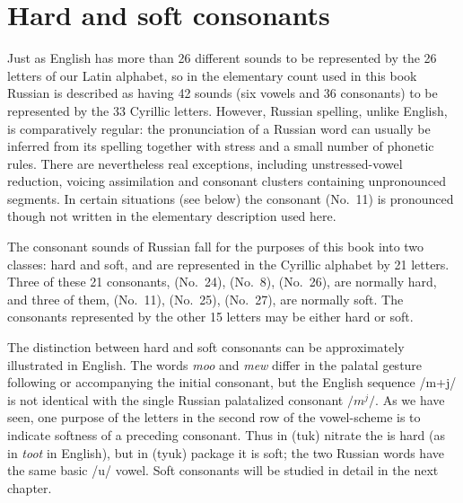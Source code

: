 \section{Hard and soft consonants}

Just as English has more than 26 different sounds to be represented by the 26 letters of our Latin alphabet, so in the elementary count used in this book Russian is described as having 42 sounds (six vowels and 36 consonants) to be represented by the 33 Cyrillic letters. However, Russian spelling, unlike English, is comparatively regular: the pronunciation of a Russian word can usually be inferred from its spelling together with stress and a small number of phonetic rules. There are nevertheless real exceptions, including unstressed-vowel reduction, voicing assimilation and consonant clusters containing unpronounced segments. In certain situations (see below) the consonant  (No.~11) is pronounced though not written in the elementary description used here.

The consonant sounds of Russian fall for the purposes of this book into two classes: hard and soft, and are represented in the Cyrillic alphabet by 21 letters. Three of these 21 consonants,  (No.~24),  (No.~8),  (No.~26), are normally hard, and three of them,  (No.~11),  (No.~25),  (No.~27), are normally soft. The consonants represented by the other 15 letters may be either hard or soft.

The distinction between hard and soft consonants can be approximately illustrated in English. The words \emph{moo} and \emph{mew} differ in the palatal gesture following or accompanying the initial consonant, but the English sequence /m+j/ is not identical with the single Russian palatalized consonant $/m^{j}/$. As we have seen, one purpose of the letters in the second row of the vowel-scheme is to indicate softness of a preceding consonant. Thus in  (tuk) nitrate the  is hard (as in \emph{toot} in English), but in  (tyuk) package it is soft; the two Russian words have the same basic /u/ vowel. Soft consonants will be studied in detail in the next chapter.

